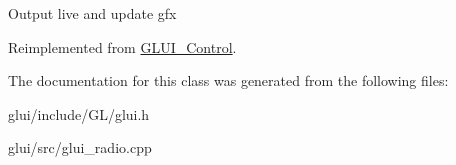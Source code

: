 Output live and update gfx 

Reimplemented from \hyperlink{classGLUI__Control}{G\-L\-U\-I\-\_\-\-Control}.



The documentation for this class was generated from the following files\-:\begin{DoxyCompactItemize}
\item 
glui/include/\-G\-L/glui.\-h\item 
glui/src/glui\-\_\-radio.\-cpp\end{DoxyCompactItemize}
